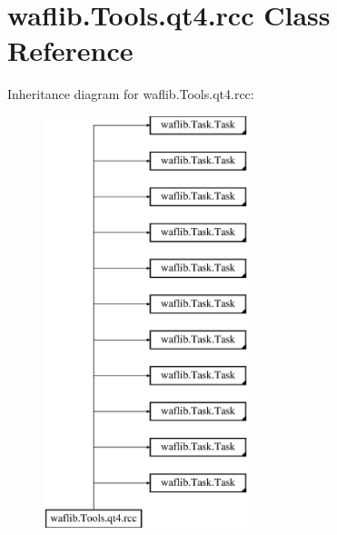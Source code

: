\hypertarget{classwaflib_1_1_tools_1_1qt4_1_1rcc}{}\section{waflib.\+Tools.\+qt4.\+rcc Class Reference}
\label{classwaflib_1_1_tools_1_1qt4_1_1rcc}
Inheritance diagram for waflib.\+Tools.\+qt4.\+rcc\+:\begin{figure}[H]
\begin{center}
\leavevmode
\includegraphics[height=12.000000cm]{classwaflib_1_1_tools_1_1qt4_1_1rcc}
\end{center}
\end{figure}
